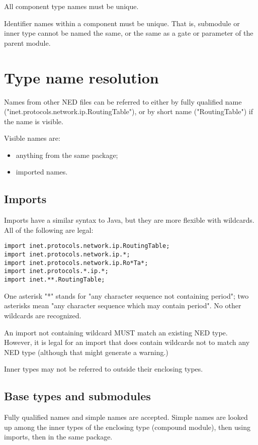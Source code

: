 All component type names must be unique.

Identifier names within a component must be unique. That is, submodule
or inner type cannot be named the same, or the same as a gate or
parameter of the parent module.



\section{Type name resolution}

Names from other NED files can be referred to either by fully qualified
name ("inet.protocols.network.ip.RoutingTable"), or by short name
("RoutingTable") if the name is visible.

Visible names are:
\begin{itemize}
  \item anything from the same package;
  \item imported names.
\end{itemize}

\subsection{Imports}

Imports have a similar syntax to Java, but they are more flexible with wildcards.
All of the following are legal:
\begin{verbatim}
import inet.protocols.network.ip.RoutingTable;
import inet.protocols.network.ip.*;
import inet.protocols.network.ip.Ro*Ta*;
import inet.protocols.*.ip.*;
import inet.**.RoutingTable;
\end{verbatim}

One asterisk "*" stands for "any character sequence not containing
period"; two asterisks mean "any character sequence which may
contain period". No other wildcards are recognized.

An import not containing wildcard MUST match an existing NED type.
However, it is legal for an import that does contain wildcards
not to match any NED type (although that might generate a warning.)

Inner types may not be referred to outside their enclosing types.

\subsection{Base types and submodules}

Fully qualified names and simple names are accepted. Simple names
are looked up among the inner types of the enclosing type (compound
module), then using imports, then in the same package.


